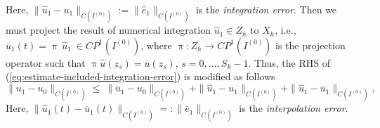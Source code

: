 %
Here, $\|\widehat{u}_1 - u_1\|_{C(I^{(0)})} := \|\widehat{e}_1\|_{C(I^{(0)})}$ is the 
{\em integration error}. Then we must project the result of numerical integration 
$\widehat{u}_1 \in Z_h$ to $X_h$, i.e., 
%
$    \overline{u}_1(t) = \uppi \, \widehat{u}_1\:\in CP^1(I^{(0)})$,
%
where $\uppi: Z_h \rightarrow CP^1(I^{(0)})$ is the projection operator such that 
$\uppi \widehat{u}(z_s) = \overline{u}(z_s)$, $s = 0, \ldots, S_k \minus 1$. Thus, the RHS 
of (\ref{eq:estimate-included-integration-error}) is modified as follows
%
\begin{equation*}
    \|u_1 - u_0\|_{C(I^{(0)})} \leq
		\:\|\overline{u}_1 - u_0\|_{C(I^{(0)})}
		+ \|\widehat{u}_1 - u_1\|_{C(I^{(0)})}
		+ \|\widehat{u}_1 - \overline{u}_1\|_{C(I^{(0)})}	,
\end{equation*}
%
Here, 
$\|\widehat{u}_1(t) - \overline{u}_1(t)\|_{C(I^{(0)})} =: \|\overline{e}_1\|_{C(I^{(0)})}$ 
is the {\em interpolation error}. 

